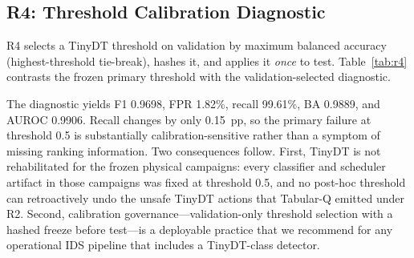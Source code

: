 \subsection{R4: Threshold Calibration Diagnostic}
R4 selects a TinyDT threshold on validation by maximum balanced accuracy (highest-threshold tie-break), hashes it, and applies it \emph{once} to test. Table~\ref{tab:r4} contrasts the frozen primary threshold with the validation-selected diagnostic.

\begin{table}[t]
\centering\scriptsize
\caption{TON-IoT TinyDT test: fixed primary versus post-hoc validation-selected threshold. The diagnostic does not replace the primary threshold; it isolates calibration sensitivity as an explanation for the primary failure.}
\label{tab:r4}
\setlength{\tabcolsep}{2.1pt}
\end{table}

The diagnostic yields F1 0.9698, FPR 1.82\%, recall 99.61\%, BA 0.9889, and AUROC 0.9906. Recall changes by only 0.15~pp, so the primary failure at threshold 0.5 is substantially calibration-sensitive rather than a symptom of missing ranking information. Two consequences follow. First, TinyDT is not rehabilitated for the frozen physical campaigns: every classifier and scheduler artifact in those campaigns was fixed at threshold 0.5, and no post-hoc threshold can retroactively undo the unsafe TinyDT actions that Tabular-Q emitted under R2. Second, calibration governance---validation-only threshold selection with a hashed freeze before test---is a deployable practice that we recommend for any operational IDS pipeline that includes a TinyDT-class detector.
